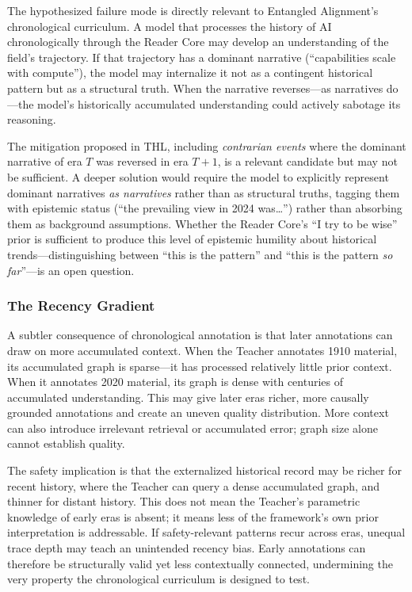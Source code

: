 The hypothesized failure mode is directly relevant to Entangled Alignment's chronological curriculum. A model that processes the history of AI chronologically through the Reader Core may develop an understanding of the field's trajectory. If that trajectory has a dominant narrative (``capabilities scale with compute''), the model may internalize it not as a contingent historical pattern but as a structural truth. When the narrative reverses---as narratives do---the model's historically accumulated understanding could actively sabotage its reasoning.

The mitigation proposed in THL, including \emph{contrarian events} where the dominant narrative of era $T$ was reversed in era $T+1$, is a relevant candidate but may not be sufficient. A deeper solution would require the model to explicitly represent dominant narratives \emph{as narratives} rather than as structural truths, tagging them with epistemic status (``the prevailing view in 2024 was\ldots'') rather than absorbing them as background assumptions. Whether the Reader Core's ``I try to be wise'' prior is sufficient to produce this level of epistemic humility about historical trends---distinguishing between ``this is the pattern'' and ``this is the pattern \emph{so far}''---is an open question.

\subsubsection{The Recency Gradient}

A subtler consequence of chronological annotation is that later annotations can draw on more accumulated context. When the Teacher annotates 1910 material, its accumulated graph is sparse---it has processed relatively little prior context. When it annotates 2020 material, its graph is dense with centuries of accumulated understanding. This may give later eras richer, more causally grounded annotations and create an uneven quality distribution. More context can also introduce irrelevant retrieval or accumulated error; graph size alone cannot establish quality.

The safety implication is that the externalized historical record may be richer
for recent history, where the Teacher can query a dense accumulated graph, and
thinner for distant history. This does not mean the Teacher's parametric
knowledge of early eras is absent; it means less of the framework's own prior
interpretation is addressable. If safety-relevant patterns recur across eras,
unequal trace depth may teach an unintended recency bias. Early annotations can
therefore be structurally valid yet less contextually connected, undermining the
very property the chronological curriculum is designed to test.

